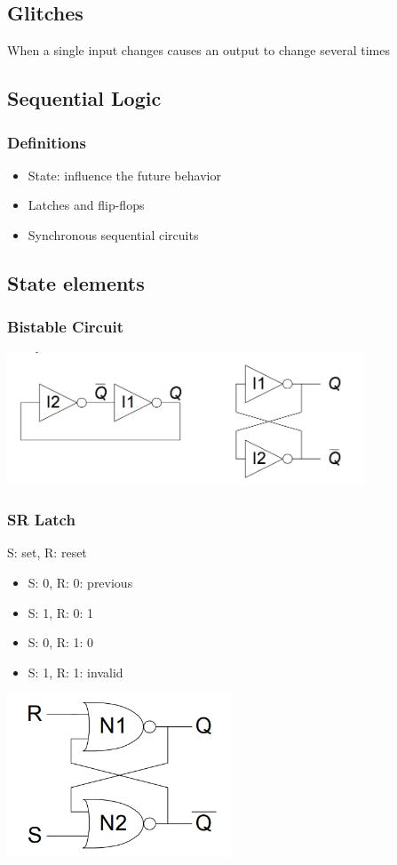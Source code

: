 \documentclass[12pt]{article}
\begin{document}
\subsection{Glitches}
When a single input changes causes an output to change several times

\subsection{Sequential Logic}
\subsubsection{Definitions}
\begin{itemize}
    \item State: influence the future behavior
    \item Latches and flip-flops
    \item Synchronous sequential circuits
\end{itemize}
\subsection{State elements}
\subsubsection{Bistable Circuit}
\includegraphics[width=0.8\textwidth]{Bistatble.png}
\subsubsection{SR Latch}
S: set, R: reset
\begin{itemize}
    \item S: 0, R: 0: previous
    \item S: 1, R: 0: 1
    \item S: 0, R: 1: 0
    \item S: 1, R: 1: invalid
\end{itemize}
\includegraphics[width=0.5\textwidth]{SRLatch.png}
\end{document}
